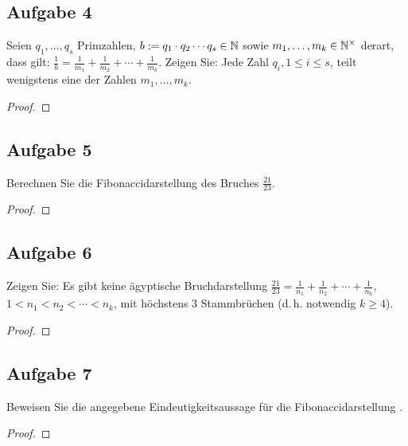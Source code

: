 \subsection{Aufgabe 4}
Seien $q_1,\dotsc,q_s$ Primzahlen, $b :={} q_1 \cdot q_2 \dotsm q_s \in \mathbb{N}{}$
sowie $m_1,\dotsc,m_k \in \mathbb{N}^\times{}$ derart, dass gilt:
$\frac{1}{b} = \frac{1}{m_1} + \frac{1}{m_2} + \dotsb + \frac{1}{m_k}$.
Zeigen Sie: Jede Zahl $q_i, 1 \leq i \leq s$, teilt wenigstens eine der Zahlen $m_1,\dotsc,m_k$.
\begin{proof}
\end{proof}

\subsection{Aufgabe 5}
Berechnen Sie die Fibonaccidarstellung des Bruches $\frac{21}{23}$.
\begin{proof}
\end{proof}

\subsection{Aufgabe 6}
Zeigen Sie: Es gibt keine ägyptische Bruchdarstellung
$\frac{21}{23} = \frac{1}{n_1} + \frac{1}{n_2} + \dotsb + \frac{1}{n_k}$,
$1 < n_1 < n_2 < \dotsb < n_k$, mit höchstens 3 Stammbrüchen
(d.\,h. notwendig $k \geq 4$).
\begin{proof}
\end{proof}

\subsection{Aufgabe 7}
Beweisen Sie die angegebene Eindeutigkeitsaussage für die Fibonaccidarstellung
\parencite[53]{book:zahlentheorie}.
\begin{proof}
\end{proof}

